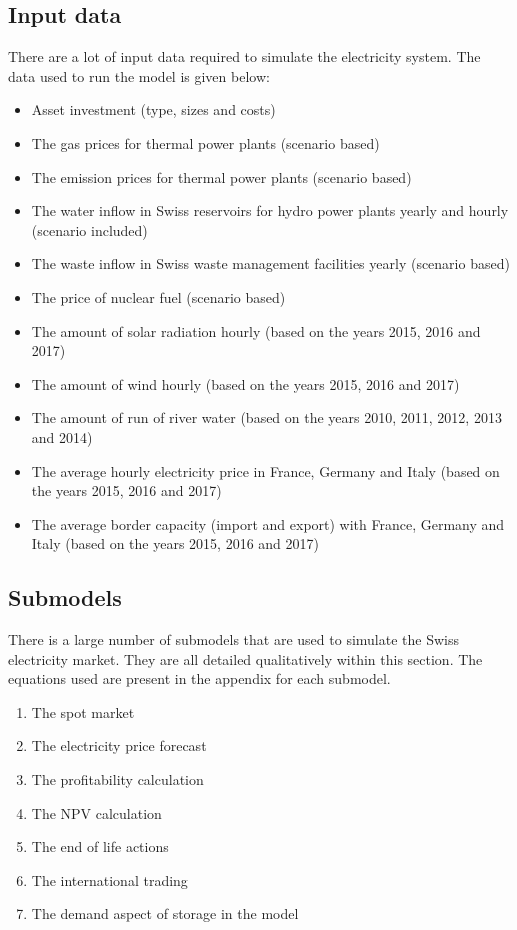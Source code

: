
\subsection{Input data}
\label{ssec:inputData}

There are a lot of input data required to simulate the electricity system. The data used to run the model is given below:

\begin{itemize}
\item Asset investment (type, sizes and costs) 
\item The gas prices for thermal power plants (scenario based)
\item The emission prices for thermal power plants (scenario based)
\item The water inflow in Swiss reservoirs for hydro power plants yearly and hourly (scenario included)
\item The waste inflow in Swiss waste management facilities yearly (scenario based)
\item The price of nuclear fuel (scenario based)
\item The amount of solar radiation hourly (based on the years 2015, 2016 and 2017)
\item The amount of wind hourly (based on the years 2015, 2016 and 2017)
\item The amount of run of river water (based on the years 2010, 2011, 2012, 2013 and 2014)
\item The average hourly electricity price in France, Germany and Italy (based on the years 2015, 2016 and 2017)
\item The average border capacity (import and export) with France, Germany and Italy (based on the years 2015, 2016 and 2017)
\end{itemize}


\subsection{Submodels}
\label{sec:submodel}

There is a large number of submodels that are used to simulate the Swiss electricity market. They are all detailed qualitatively within this section. The equations used are present in the appendix for each submodel.

\begin{enumerate}
\item The spot market
\item The electricity price forecast
\item The profitability calculation
\item The NPV calculation
\item The end of life actions
\item The international trading
\item The demand aspect of storage in the model
\end{enumerate}

